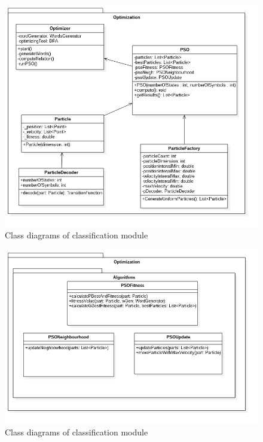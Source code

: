 \documentclass{mini}
\begin{document}
%
%
\begin{figure}[H]
    \centering
    \includegraphics[width=1.0\textwidth]{../uml/classes/optimizationMain.jpg}
    \caption{Class diagrams of classification module}
    \label{fig:classification_main_class}
\end{figure}

\begin{figure}[H]
    \centering
    \includegraphics[width=1.0\textwidth]{../uml/classes/optimizationAlg.jpg}
    \caption{Class diagrams of classification module}
    \label{fig:classification_alg_class}
\end{figure}
\end{document}
